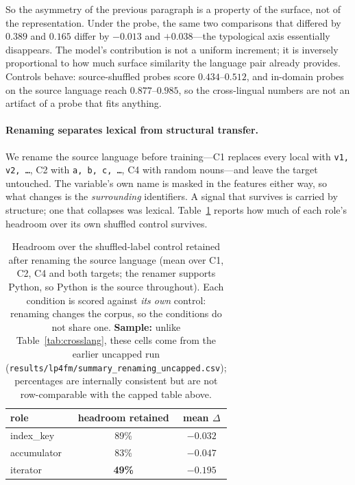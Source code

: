 So the asymmetry of the previous paragraph is a property of the surface, not
of the representation. Under the probe, the same two comparisons that differed
by $0.389$ and $0.165$ differ by $-0.013$ and $+0.038$---the typological axis
essentially disappears. The model's contribution is not a uniform increment; it
is inversely proportional to how much surface similarity the language pair
already provides. Controls behave: source-shuffled probes score $0.434$--$0.512$,
and in-domain probes on the source language reach $0.877$--$0.985$, so the
cross-lingual numbers are not an artifact of a probe that fits anything.

\paragraph{Renaming separates lexical from structural transfer.} We rename
the source language before training---C1 replaces every local with
\texttt{v1, v2, \dots}, C2 with \texttt{a, b, c, \dots}, C4 with random
nouns---and leave the target untouched. The variable's own name is masked in
the features either way, so what changes is the \emph{surrounding}
identifiers. A signal that survives is carried by structure; one that
collapses was lexical. Table~\ref{tab:crosslang-rename} reports how much of
each role's headroom over its own shuffled control survives.

\begin{table}[t]
\centering
\caption{Headroom over the shuffled-label control retained after renaming the
source language (mean over C1, C2, C4 and both targets; the renamer supports
Python, so Python is the source throughout). Each condition is scored against
\emph{its own} control: renaming changes the corpus, so the conditions do not
share one. \textbf{Sample:} unlike Table~\ref{tab:crosslang}, these cells come
from the earlier uncapped run
(\texttt{results/lp4fm/summary\_renaming\_uncapped.csv}); percentages are
internally consistent but are not row-comparable with the capped table above.}
\label{tab:crosslang-rename}
\begin{tabular}{lcc}
\toprule
role & headroom retained & mean $\Delta$ \\
\midrule
index\_key  & 89\% & $-0.032$ \\
accumulator & 83\% & $-0.047$ \\
iterator    & \textbf{49\%} & $\mathbf{-0.195}$ \\
\bottomrule
\end{tabular}
\end{table}

